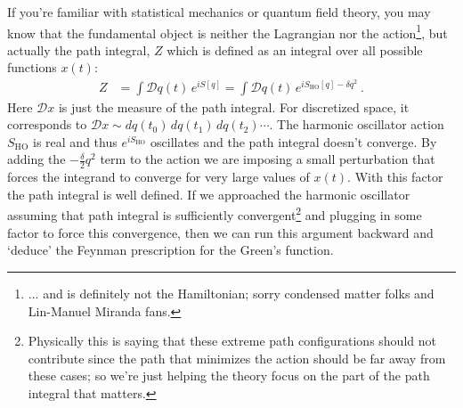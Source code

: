 If you're familiar with statistical mechanics or quantum field theory, you may know that the fundamental object is neither the Lagrangian nor the action\footnote{... and is definitely not the Hamiltonian; sorry condensed matter folks and Lin-Manuel Miranda fans.}, but actually the path integral, $Z$ which is defined as an integral over all possible functions $x(t)$:
\begin{align}
  Z &= 
  \int \mathcal Dq(t) \, e^{iS[q]}
  = 
  \int \mathcal Dq(t) \, e^{iS_\text{HO}[q] - \delta q^2} \ .
\end{align}
Here $\mathcal Dx$ is just the measure of the path integral. For discretized space, it corresponds to $\mathcal Dx\sim dq(t_0)\,dq(t_1)\, dq(t_2)\cdots$. The harmonic oscillator action $S_\text{HO}$ is real and thus $e^{iS_\text{HO}}$ oscillates and the path integral doesn't converge. By adding the $- \frac{\delta}{2} q^2$ term to the action we are imposing a small perturbation that forces the integrand to converge for very large values of $x(t)$. With this factor the path integral is well defined. If we approached the harmonic oscillator assuming that path integral is sufficiently convergent\footnote{Physically this is saying that these extreme path configurations should not contribute since the path that minimizes the action should be far away from these cases; so we're just helping the theory focus on the part of the path integral that matters.} and plugging in some factor to force this convergence, then we can run this argument backward and `deduce' the Feynman prescription for the Green's function.

